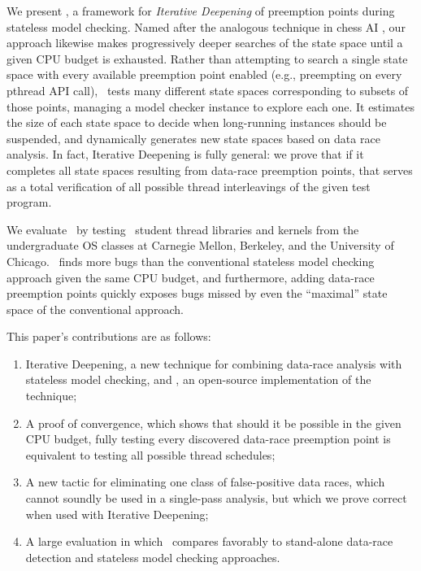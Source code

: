 We present \quicksand, a framework for {\em Iterative Deepening} of preemption points during stateless model checking.
Named after the analogous technique in chess AI \cite{iterative-deepening-chess-ai}, our approach likewise makes progressively deeper searches of the state space until a given CPU budget is exhausted.
Rather than attempting to search a single state space with every available preemption point enabled (e.g., preempting on every pthread API call),
\quicksand~tests many different state spaces corresponding to subsets of those points, managing a model checker instance to explore each one.
It estimates the size of each state space to decide when long-running instances should be suspended, and dynamically generates new state spaces based on data race analysis.
In fact, Iterative Deepening is fully general:
we prove that if it completes all state spaces resulting from data-race preemption points,
that serves as a total verification of all possible thread interleavings of the given test program.

We evaluate \quicksand~by testing \numstudence~student thread libraries and kernels from the undergraduate OS classes at Carnegie Mellon, Berkeley, and the University of Chicago.
\quicksand~finds more bugs than the conventional stateless model checking approach given the same CPU budget,
and furthermore, adding data-race preemption points quickly exposes bugs missed by even the ``maximal'' state space of the conventional approach.

This paper's contributions are as follows:
\begin{enumerate}
	\item Iterative Deepening, a new technique for combining data-race analysis with stateless model checking, and \quicksand, an open-source implementation of the technique;
	\item A proof of convergence, which shows that should it be possible in the given CPU budget,
		fully testing every discovered data-race preemption point is equivalent to testing all possible thread schedules;
	\item A new tactic for eliminating one class of false-positive data races,
		which cannot soundly be used in a single-pass analysis,
		but which we prove correct when used with Iterative Deepening;
	\item A large evaluation in which \quicksand~compares favorably to stand-alone data-race detection and stateless model checking approaches.
\end{enumerate}

